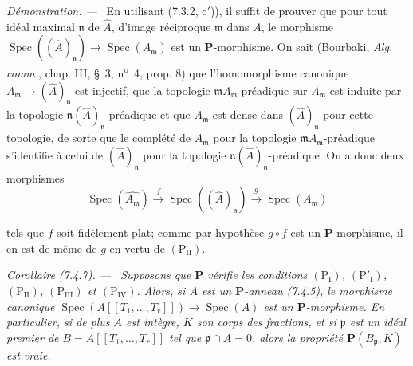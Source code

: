 \documentclass[10pt,oneside]{book}
\newcommand{\oldpage}[2][]{%
  \setcounter{footnote}{0}%
  \marginpar{\scriptsize\textbf{#1}~|~#2}\ignorespaces}
\newenvironment{corollary}[1][]{%
  \par\medskip\noindent\itshape Corollaire (#1). ---\ }{\par}
\newenvironment{proof}{%
  \par\medskip\noindent\textit{Démonstration. ---\ }}{\par}
\begin{document}
\begin{proof}
En utilisant (7.3.2, c$'$)), il suffit de prouver que pour tout idéal
maximal $\mathfrak n$ de $\widehat A$, d'image réciproque $\mathfrak m$
dans $A$, le morphisme
$\operatorname{Spec}((\widehat A)_{\mathfrak n})\to
\operatorname{Spec}(A_{\mathfrak m})$ est un $\boldsymbol P$-morphisme.
On sait (Bourbaki, \emph{Alg. comm.}, chap. III, \S~3,
n\textsuperscript{o}~4, prop. 8) que l'homomorphisme canonique
$A_{\mathfrak m}\to(\widehat A)_{\mathfrak n}$ est injectif, que la
topologie $\mathfrak mA_{\mathfrak m}$-préadique sur $A_{\mathfrak m}$ est
induite par la topologie
$\mathfrak n(\widehat A)_{\mathfrak n}$-préadique et que
$A_{\mathfrak m}$ est dense dans $(\widehat A)_{\mathfrak n}$ pour cette
topologie, de sorte que le complété de $A_{\mathfrak m}$ pour la topologie
$\mathfrak mA_{\mathfrak m}$-préadique s'identifie à celui de
$(\widehat A)_{\mathfrak n}$ pour la topologie
$\mathfrak n(\widehat A)_{\mathfrak n}$-préadique. On a donc deux morphismes
\[
\operatorname{Spec}(\widehat{A_{\mathfrak m}})
\xrightarrow{f}\operatorname{Spec}((\widehat A)_{\mathfrak n})
\xrightarrow{g}\operatorname{Spec}(A_{\mathfrak m})
\]

\oldpage[IV-2]{203}

tels que $f$ soit fidèlement plat; comme par hypothèse $g\circ f$ est un
$\boldsymbol P$-morphisme, il en est de même de $g$ en vertu de
$(\mathrm P_{\mathrm{II}})$.
\end{proof}

\begin{corollary}[7.4.7]
\label{IV.2.s7.4.7-fr}
Supposons que $\boldsymbol P$ vérifie les conditions
$(\mathrm P_{\mathrm I})$, $(\mathrm P'_{\mathrm I})$,
$(\mathrm P_{\mathrm{II}})$, $(\mathrm P_{\mathrm{III}})$ et
$(\mathrm P_{\mathrm{IV}})$. Alors, si $A$ est un
$\boldsymbol P$-anneau (7.4.5), le morphisme canonique
$\operatorname{Spec}(A[[T_1,\ldots,T_r]])\to\operatorname{Spec}(A)$ est un
$\boldsymbol P$-morphisme. En particulier, si de plus $A$ est intègre, $K$
son corps des fractions, et si $\mathfrak p$ est un idéal premier de
$B=A[[T_1,\ldots,T_r]]$ tel que $\mathfrak p\cap A=0$, alors la propriété
$\boldsymbol P(B_{\mathfrak p},K)$ est vraie.
\end{corollary}
\end{document}
